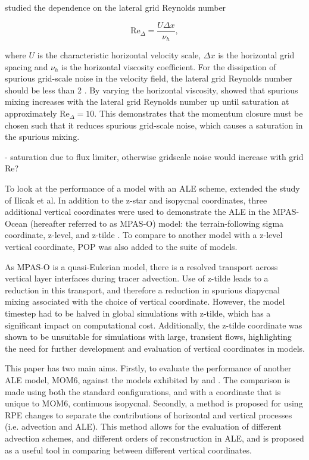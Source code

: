 \citet{ilicak12} studied the dependence on the lateral grid Reynolds number

\begin{equation}
  \mathrm{Re}_\Delta = \frac{U\Delta x}{\nu_h},
\end{equation}

where $U$ is the characteristic horizontal velocity scale, $\Delta x$ is the horizontal grid spacing and $\nu_h$ is the horizontal viscosity coefficient. For the dissipation of spurious grid-scale noise in the velocity field, the lateral grid Reynolds number should be less than 2 \citep[p.~410]{griffies04}. By varying the horizontal viscosity, \citet{ilicak12} showed that spurious mixing increases with the lateral grid Reynolds number up until saturation at approximately $\mathrm{Re}_\Delta = 10$. This demonstrates that the momentum closure must be chosen such that it reduces spurious grid-scale noise, which causes a saturation in the spurious mixing.

- saturation due to flux limiter, otherwise gridscale noise would increase with grid Re?

To look at the performance of a model with an ALE scheme, \citet{petersen15} extended the study of Ilicak et al. In addition to the z-star and isopycnal coordinates, three additional vertical coordinates were used to demonstrate the ALE in the MPAS-Ocean (hereafter referred to as MPAS-O) model: the terrain-following sigma coordinate, z-level, and z-tilde \citep{leclair11}. To compare to another model with a z-level vertical coordinate, POP was also added to the suite of models.

As MPAS-O is a quasi-Eulerian model, there is a resolved transport across vertical layer interfaces during tracer advection. Use of z-tilde leads to a reduction in this transport, and therefore a reduction in spurious diapycnal mixing associated with the choice of vertical coordinate. However, the model timestep had to be halved in global simulations with z-tilde, which has a significant impact on computational cost. Additionally, the z-tilde coordinate was shown to be unsuitable for simulations with large, transient flows, highlighting the need for further development and evaluation of vertical coordinates in models.

This paper has two main aims. Firstly, to evaluate the performance of another ALE model, MOM6, against the models exhibited by \citet{ilicak12} and \citet{petersen15}. The comparison is made using both the standard configurations, and with a coordinate that is unique to MOM6, continuous isopycnal. Secondly, a method is proposed for using RPE changes to separate the contributions of horizontal and vertical processes (i.e. advection and ALE). This method allows for the evaluation of different advection schemes, and different orders of reconstruction in ALE, and is proposed as a useful tool in comparing between different vertical coordinates.
